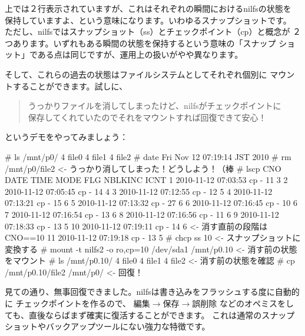 \documentclass[mingoth,a4paper]{jsarticle}
\begin{document}
上では２行表示されていますが、これはそれぞれの瞬間におけるnilfsの状態を
保持していますよ、という意味になります。いわゆるスナップショットです。
ただし、nilfsではスナップショット（ss）とチェックポイント（cp）と概念が
２つあります。いずれもある瞬間の状態を保持するという意味の「スナップ
ショット」である点は同じですが、運用上の扱いがやや異なります。

そして、これらの過去の状態はファイルシステムとしてそれぞれ個別に
マウントすることができます。試しに、
\begin{quote}
\Large{うっかりファイルを消してしまったけど、nilfsがチェックポイントに\\
保存してくれていたのでそれをマウントすれば回復できて安心！}
\end{quote}
というデモをやってみましょう：

\begin{commandline}
# ls /mnt/p0/
4 file0  4 file1  4 file2
# date
Fri Nov 12 07:19:14 JST 2010
# rm /mnt/p0/file2                                       <- うっかり消してしまった！どうしよう！（棒
# lscp
CNO        DATE     TIME  MODE  FLG   NBLKINC       ICNT
  1  2010-11-12 07:03:53   cp    -         11          3
  2  2010-11-12 07:05:45   cp    -         14          4
  3  2010-11-12 07:12:55   cp    -         12          5
  4  2010-11-12 07:13:21   cp    -         15          6
  5  2010-11-12 07:13:32   cp    -         27          6
  6  2010-11-12 07:16:45   cp    -         10          6
  7  2010-11-12 07:16:54   cp    -         13          6
  8  2010-11-12 07:16:56   cp    -         11          6
  9  2010-11-12 07:18:33   cp    -         13          5
 10  2010-11-12 07:19:11   cp    -         14          6 <- 消す直前の段階はCNO==10
 11  2010-11-12 07:19:18   cp    -         13          5
# chcp ss 10                                             <- スナップショットに変換する
# mount -t nilfs2 -o ro,cp=10 /dev/sda1 /mnt/p0.10       <- 消す前の状態をマウント
# ls /mnt/p0.10/
4 file0  4 file1  4 file2                                <- 消す前の状態を確認
# cp /mnt/p0.10/file2 /mnt/p0/                           <- 回復！
\end{commandline}

見ての通り、無事回復できました。nilfsは書き込みをフラッシュする度に自動的に
チェックポイントを作るので、
編集$\rightarrow$保存$\rightarrow$誤削除
などのオペミスをしても、直後ならばまず確実に復活することができます。
これは通常のスナップショットやバックアップツールにない強力な特徴です。
\end{document}
